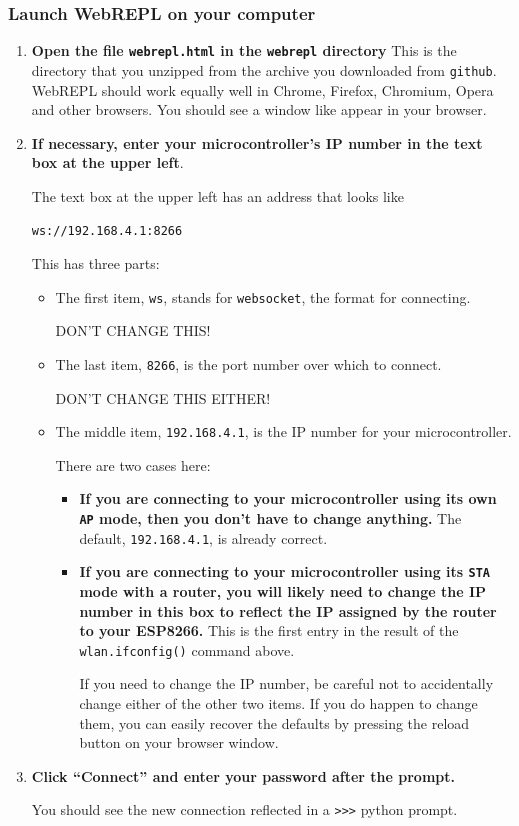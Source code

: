 \subsubsection{\howto Launch WebREPL on your computer}
\begin{enumerate}
	\item  \textbf{Open the file \texttt{webrepl.html} in the \texttt{webrepl} directory}
	This is the directory that you unzipped from the archive you downloaded from \texttt{github}.
	WebREPL should work equally well in Chrome, Firefox, Chromium, Opera and other browsers.
	You should see a window like  appear in your browser.

	\item \textbf{If necessary, enter your microcontroller's IP number in the text box at the upper left}.

	The text box at the upper left has an address that looks like
\begin{lstlisting}[language=bash]
ws://192.168.4.1:8266
\end{lstlisting}
	This has three parts:
	\begin{itemize}
		\item The first item, \verb|ws|, stands for \texttt{websocket}, the format for connecting.

		DON'T CHANGE THIS!

		\item The last item, \verb|8266|, is the port number over which to connect.

		DON'T CHANGE THIS EITHER!

		\item The middle item, \verb|192.168.4.1|, is the IP number for your microcontroller.

		There are two cases here:
	\begin{itemize}
		\item \textbf{If you are connecting to your microcontroller using its own \texttt{AP} mode, then you don't have to change anything.} The default, \verb|192.168.4.1|, is already correct.

		\item \textbf{If you are connecting to your microcontroller using its \texttt{STA} mode with a router, you will likely need to change the IP number in this box to reflect the IP assigned by the router to your ESP8266.} This is the first entry in the result of the \texttt{wlan.ifconfig()} command above.

		If you need to change the IP number, be careful not to accidentally change either of the other two items.
		If you do happen to change them, you can easily recover the defaults by pressing the reload button on your browser window.
	\end{itemize}
	\end{itemize}


	\item \textbf{Click “Connect” and enter your password after the prompt.}

	You should see the new connection reflected in a \verb|>>>| python prompt.

\end{enumerate}


